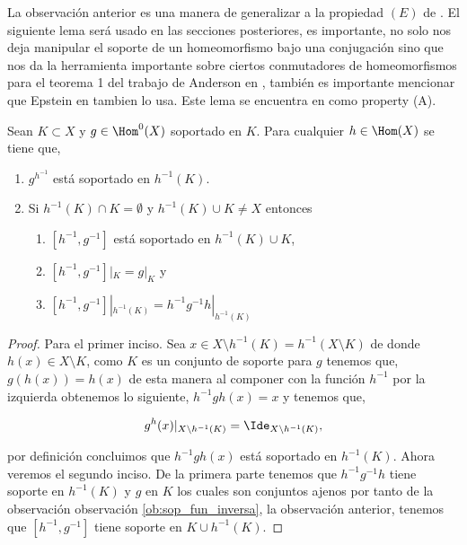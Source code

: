  
 La observación anterior es una manera de generalizar a la propiedad $(E)$ de \cite{ander}. El siguiente lema será usado en las secciones posteriores, es importante, no solo nos deja manipular el soporte de un homeomorfismo bajo una conjugación sino que nos da la herramienta importante sobre ciertos conmutadores de homeomorfismos para el teorema 1 del trabajo de Anderson en \cite{ander}, también es importante mencionar que Epstein en \cite{epst} tambien lo usa. Este lema se encuentra en \cite{ander} como property (A).

\begin{lm}\label{lm:obs_A}
Sean $K \subset X$ y $g \in \Hom^0(X)$ soportado en $K$. Para cualquier $h \in \Hom(X)$ se tiene que,
 
	\begin{enumerate}
	\item  $g^{h^{-1}}$ está soportado en $h^{-1}(K)$.
	\item Si $h^{-1}(K) \cap K = \emptyset$ y $h^{-1}(K) \cup K \neq X$  entonces
		\begin{enumerate}
		\item $[h^{-1},g^{-1}]$ está soportado en $h^{-1}(K) \cup K$,
		\item $[h^{-1},g^{-1}]|_K=g|_K$ y 
		\item $[h^{-1},g^{-1}]|_{h^{-1}(K)}=h^{-1}g^{-1}h|_{h^{-1}(K)}$
		\end{enumerate}	
	\end{enumerate}
\end{lm}
	
\begin{proof}
Para el primer inciso. Sea $x \in X \setminus h^{-1}(K)= h^{-1}( X \setminus K)$ de donde $h(x) \in X \setminus K$, como $K$  es un conjunto de soporte para $g$ tenemos que, $g(h(x))=h(x)$ de esta manera al componer con la función $h^{-1}$ por la izquierda obtenemos lo siguiente, $h^{-1}gh(x)=x$ y tenemos que, 
 
 $$g^{h}(x)|_{X \setminus h^{-1}(K)}=\Ide_{X \setminus h^{-1}(K)},$$ 
 
por definición concluimos que $h^{-1}gh(x)$ está soportado en $h^{-1}(K).$ Ahora veremos el segundo inciso. De la primera parte tenemos que $h^{-1}g^{-1}h$ tiene soporte en $h^{-1}(K)$ y $g$ en $K$ los cuales son conjuntos ajenos por tanto de la observación observación \ref{ob:sop_fun_inversa}, la observación anterior, tenemos que $[h^{-1},g^{-1}]$ tiene soporte en $K \cup h^{-1}(K).$
   
\end{proof}


